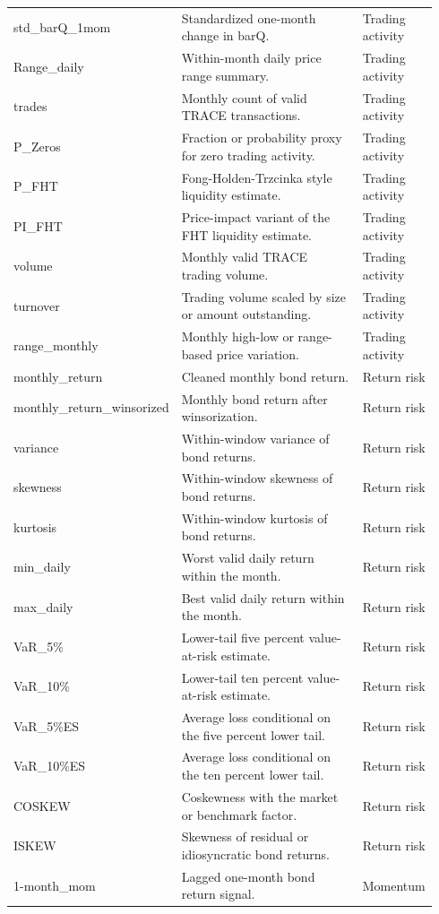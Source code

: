 \documentclass[11pt]{article}
\begin{document}
\begin{landscape}
\begin{longtable}{p{0.17\linewidth}p{0.62\linewidth}p{0.15\linewidth}}
std\_barQ\_1mom & Standardized one-month change in barQ. & Trading activity \\
Range\_daily & Within-month daily price range summary. & Trading activity \\
trades & Monthly count of valid TRACE transactions. & Trading activity \\
P\_Zeros & Fraction or probability proxy for zero trading activity. & Trading activity \\
P\_FHT & Fong-Holden-Trzcinka style liquidity estimate. & Trading activity \\
PI\_FHT & Price-impact variant of the FHT liquidity estimate. & Trading activity \\
volume & Monthly valid TRACE trading volume. & Trading activity \\
turnover & Trading volume scaled by size or amount outstanding. & Trading activity \\
range\_monthly & Monthly high-low or range-based price variation. & Trading activity \\
monthly\_return & Cleaned monthly bond return. & Return risk \\
monthly\_return\_winsorized & Monthly bond return after winsorization. & Return risk \\
variance & Within-window variance of bond returns. & Return risk \\
skewness & Within-window skewness of bond returns. & Return risk \\
kurtosis & Within-window kurtosis of bond returns. & Return risk \\
min\_daily & Worst valid daily return within the month. & Return risk \\
max\_daily & Best valid daily return within the month. & Return risk \\
VaR\_5\% & Lower-tail five percent value-at-risk estimate. & Return risk \\
VaR\_10\% & Lower-tail ten percent value-at-risk estimate. & Return risk \\
VaR\_5\%ES & Average loss conditional on the five percent lower tail. & Return risk \\
VaR\_10\%ES & Average loss conditional on the ten percent lower tail. & Return risk \\
COSKEW & Coskewness with the market or benchmark factor. & Return risk \\
ISKEW & Skewness of residual or idiosyncratic bond returns. & Return risk \\
1-month\_mom & Lagged one-month bond return signal. & Momentum \\

\end{longtable}
\end{landscape}
\end{document}
